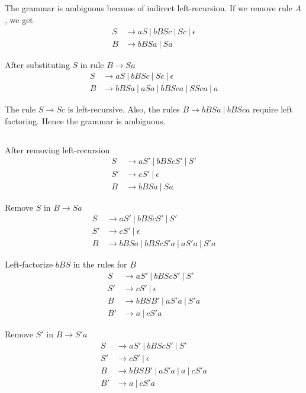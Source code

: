 \documentclass{article}
\begin{document}
\subsection{}
The grammar is ambiguous because of indirect left-recursion. If we remove
rule $A$, we get
\begin{align*}
	S & \rightarrow  aS ~|~ bBSc ~|~ Sc ~|~ \epsilon \\
	B & \rightarrow bBSa ~|~ Sa
\end{align*}

After substituting $S$ in rule $B \rightarrow Sa$
\begin{align*}
	S & \rightarrow  aS ~|~ bBSc ~|~ Sc ~|~ \epsilon      \\
	B & \rightarrow bBSa ~|~ aSa ~|~ bBSca ~|~ SSca ~|~ a
\end{align*}

The rule $S \rightarrow Sc$ is left-recursive. Also, the rules
$B \rightarrow bBSa ~|~ bBSca$ require left factoring. Hence the grammar is ambiguous.

\subsection{}
After removing left-recursion
\begin{align*}
	S  & \rightarrow aS' ~|~ bBScS' ~|~ S' \\
	S' & \rightarrow cS' ~|~ \epsilon      \\
	B  & \rightarrow bBSa ~|~ Sa
\end{align*}

Remove $S$ in $B \rightarrow Sa$
\begin{align*}
	S  & \rightarrow aS' ~|~ bBScS' ~|~ S'             \\
	S' & \rightarrow cS' ~|~ \epsilon                  \\
	B  & \rightarrow bBSa ~|~ bBScS'a ~|~ aS'a ~|~ S'a
\end{align*}

Left-factorize $bBS$ in the rules for $B$
\begin{align*}
	S  & \rightarrow aS' ~|~ bBScS' ~|~ S'  \\
	S' & \rightarrow cS' ~|~ \epsilon       \\
	B  & \rightarrow bBSB' ~|~ aS'a ~|~ S'a \\
	B' & \rightarrow a ~|~ cS'a
\end{align*}

Remove $S'$ in $B \rightarrow S'a$
\begin{align*}
	S  & \rightarrow aS' ~|~ bBScS' ~|~ S'         \\
	S' & \rightarrow cS' ~|~ \epsilon              \\
	B  & \rightarrow bBSB' ~|~ aS'a ~|~ a ~|~ cS'a \\
	B' & \rightarrow a ~|~ cS'a
\end{align*}
\end{document}
